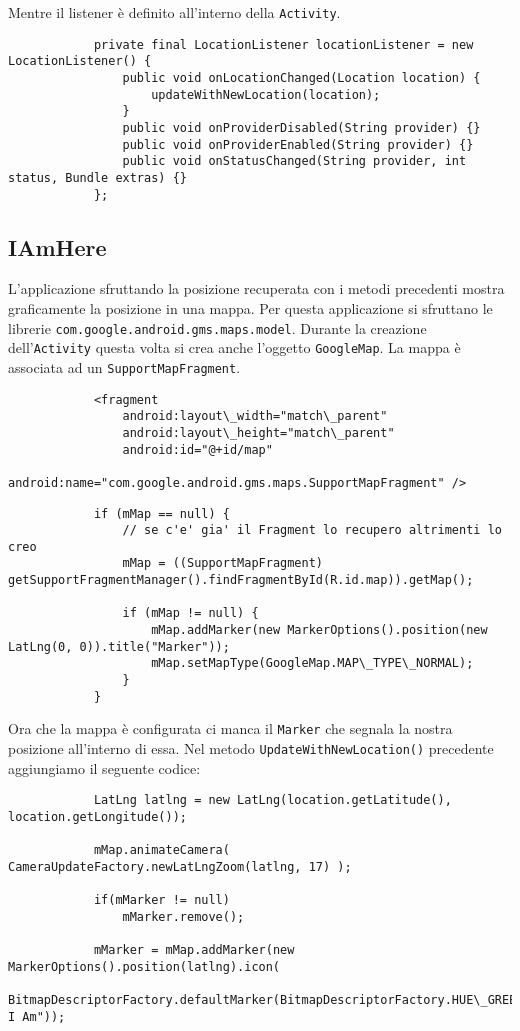 		Mentre il listener è definito all'interno della \lstinline|Activity|.
		\begin{lstlisting}
			private final LocationListener locationListener = new LocationListener() {
				public void onLocationChanged(Location location) {
					updateWithNewLocation(location);
				}
				public void onProviderDisabled(String provider) {}
				public void onProviderEnabled(String provider) {}
				public void onStatusChanged(String provider, int status, Bundle extras) {}
			};
		\end{lstlisting}

	\subsection{IAmHere}
		L'applicazione sfruttando la posizione recuperata con i metodi precedenti mostra graficamente la posizione in una mappa.
		Per questa applicazione si sfruttano le librerie \lstinline|com.google.android.gms.maps.model|. Durante la creazione dell'\lstinline|Activity| questa volta si crea anche l'oggetto \lstinline|GoogleMap|. La mappa è associata ad un \lstinline|SupportMapFragment|.
		\begin{lstlisting}
			<fragment
				android:layout\_width="match\_parent"
				android:layout\_height="match\_parent" 
				android:id="@+id/map" 
				android:name="com.google.android.gms.maps.SupportMapFragment" />
		\end{lstlisting}
		\begin{lstlisting}
			if (mMap == null) {
				// se c'e' gia' il Fragment lo recupero altrimenti lo creo
				mMap = ((SupportMapFragment) getSupportFragmentManager().findFragmentById(R.id.map)).getMap();
				
				if (mMap != null) {
					mMap.addMarker(new MarkerOptions().position(new LatLng(0, 0)).title("Marker"));
					mMap.setMapType(GoogleMap.MAP\_TYPE\_NORMAL);
				}
			}
		\end{lstlisting}
		
		Ora che la mappa è configurata ci manca il \lstinline|Marker| che segnala la nostra posizione all'interno di essa. Nel metodo \lstinline|UpdateWithNewLocation()| precedente aggiungiamo il seguente codice:
		\begin{lstlisting}
			LatLng latlng = new LatLng(location.getLatitude(), location.getLongitude());
			
			mMap.animateCamera( CameraUpdateFactory.newLatLngZoom(latlng, 17) );
			
			if(mMarker != null)
				mMarker.remove();
			
			mMarker = mMap.addMarker(new MarkerOptions().position(latlng).icon(
				BitmapDescriptorFactory.defaultMarker(BitmapDescriptorFactory.HUE\_GREEN)).title("Here I Am"));
		\end{lstlisting}
		

